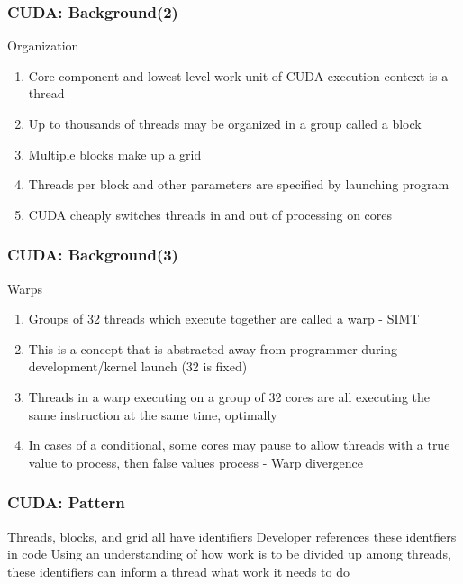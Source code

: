\documentclass[10pt, xcolor={dvipsnames}, aspectratio=169]{beamer}
\begin{document}
\begin{frame}
\frametitle{CUDA: Background(2)}
Organization
\begin{enumerate}
	\item Core component and lowest-level work unit of CUDA execution context is a thread
	\item Up to thousands of threads may be organized in a group called a block
	\item Multiple blocks make up a grid
	\item Threads per block and other parameters are specified by launching program
	\item CUDA cheaply switches threads in and out of processing on cores
\end{enumerate}
\end{frame}

\begin{frame}
	\frametitle{CUDA: Background(3)}
	Warps
	\begin{enumerate}
		\item Groups of 32 threads which execute together are called a warp - SIMT
		\item This is a concept that is abstracted away from programmer during development/kernel launch (32 is fixed)
		\item Threads in a warp executing on a group of 32 cores are all executing the same instruction at the same time, optimally
		\item In cases of a conditional, some cores may pause to allow threads with a true value to process, then false values process - Warp divergence
	\end{enumerate}
\end{frame}

\begin{frame}
\frametitle{CUDA: Pattern}

Threads, blocks, and grid all have identifiers
\newline\newline
Developer references these identfiers in code
\newline\newline
Using an understanding of how work is to be divided up among threads, these identifiers can inform a thread what work it needs to do

\end{frame}
\end{document}

